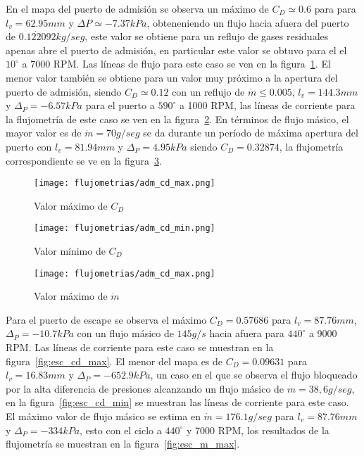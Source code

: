En el mapa del puerto de admisión se observa un máximo de $C_{D}\simeq 0.6$ para
para $l_{v}=62.95 mm$ y $\Delta P\simeq -7.37 kPa$, obteneniendo un flujo hacia
afuera del puerto de $\dot{0.122092} kg/seg$, este valor se obtiene para un
reflujo de gases residuales apenas abre el puerto de admisión, en particular
este valor se obtuvo para el el $10^{\circ}$ a 7000 RPM.
%
Las líneas de flujo para este caso se ven en la figura~\ref{fig:adm_cd_max}.
%
El menor valor también se obtiene para un valor muy próximo a la apertura del
puerto de admisión, siendo $C_{D}\simeq 0.12$ con un reflujo de
$\dot{m}\le 0.005$, $l_{v}=144.3 mm$ y $\Delta_{P}=-6.57 kPa$ para el puerto a
$590^{\circ}$ a 1000 RPM, las líneas de corriente para la flujometría de este
caso se ven en la figura~\ref{fig:adm_cd_min}.
%
En términos de flujo másico, el mayor valor  es de $\dot{m}=70 g/seg$ se da
durante un período de máxima apertura del puerto con $l_{v}=81.94 mm$ y
$\Delta_{P}=4.95 kPa$ siendo $C_{D}=0.32874$, la flujometría correspondiente se
ve en la figura~\ref{fig:adm_m_max}.

\begin{figure}[ht]
    \centering
    \texttt{[image: flujometrias/adm\_cd\_max.png]}
    \caption{Valor máximo de $C_{D}$}\label{fig:adm_cd_max}
\end{figure}

\begin{figure}[ht]
    \centering
    \texttt{[image: flujometrias/adm\_cd\_min.png]}
    \caption{Valor mínimo de $C_{D}$}\label{fig:adm_cd_min}
\end{figure}

\begin{figure}[ht]
    \centering
    \texttt{[image: flujometrias/adm\_cd\_max.png]}
    \caption{Valor máximo de $\dot{m}$}\label{fig:adm_m_max}
\end{figure}

Para el puerto de escape se observa el máximo $C_{D}=0.57686$ para
$l_{v}=87.76 mm$, $\Delta_{P}=-10.7 kPa$ con un flujo másico de $145 g/s$
hacia afuera para $440^{\circ}$ a 9000 RPM.
%
Las líneas de corriente para este caso se muestran en la
figura~\ref{fig:esc_cd_max}.
%
El menor del mapa es de $C_{D}=0.09631$ para $l_{v}=16.83 mm$ y
$\Delta_{P}=-652.9 kPa$, un caso en el que se observa el flujo bloqueado por la
alta diferencia de presiones alcanzando un flujo másico de $\dot{m}=38,6 g/seg$,
en la figura~\ref{fig:esc_cd_min} se muestran las líneas de corriente para este caso.
%
El máximo valor de flujo másico se estima en $\dot{m}=176.1 g/seg$ para
$l_{v}=87.76 mm$ y $\Delta_{P}=-334 kPa$, esto con el ciclo a $440^{\circ}$ y 7000
RPM, los resultados de la flujometría se muestran en la figura~\ref{fig:esc_m_max}.

